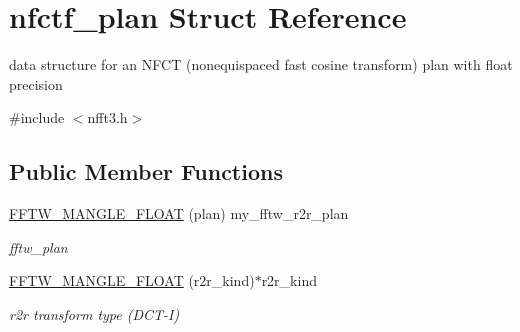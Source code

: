 \hypertarget{structnfctf__plan}{\section{nfctf\-\_\-plan Struct Reference}
\label{structnfctf__plan}
}


data structure for an N\-F\-C\-T (nonequispaced fast cosine transform) plan with float precision  




{\ttfamily \#include $<$nfft3.\-h$>$}

\subsection*{Public Member Functions}
\begin{DoxyCompactItemize}
\item 
\hypertarget{structnfctf__plan_a18d7721bf6d8ccbc5bb20e2dad30f9a3}{\hyperlink{structnfctf__plan_a18d7721bf6d8ccbc5bb20e2dad30f9a3}{F\-F\-T\-W\-\_\-\-M\-A\-N\-G\-L\-E\-\_\-\-F\-L\-O\-A\-T} (plan) my\-\_\-fftw\-\_\-r2r\-\_\-plan}\label{structnfctf__plan_a18d7721bf6d8ccbc5bb20e2dad30f9a3}

\begin{DoxyCompactList}\small\item\em fftw\-\_\-plan \end{DoxyCompactList}\item 
\hypertarget{structnfctf__plan_a3aef4c36c692ab0ac6e9ab69b32ac761}{\hyperlink{structnfctf__plan_a3aef4c36c692ab0ac6e9ab69b32ac761}{F\-F\-T\-W\-\_\-\-M\-A\-N\-G\-L\-E\-\_\-\-F\-L\-O\-A\-T} (r2r\-\_\-kind)$\ast$r2r\-\_\-kind}\label{structnfctf__plan_a3aef4c36c692ab0ac6e9ab69b32ac761}

\begin{DoxyCompactList}\small\item\em r2r transform type (D\-C\-T-\/\-I) \end{DoxyCompactList}\end{DoxyCompactItemize}
